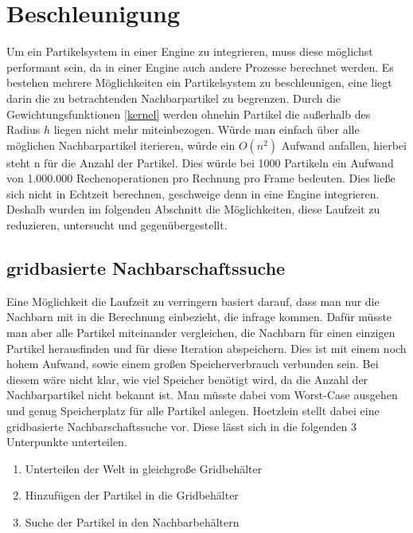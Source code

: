 \documentclass[intern,palatino]{cgBA}
\begin{document}
\section{Beschleunigung}\label{besch}

Um ein Partikelsystem in einer Engine zu integrieren, muss diese möglichst performant sein, da in einer Engine auch andere Prozesse berechnet werden. Es bestehen mehrere Möglichkeiten ein Partikelsystem zu beschleunigen, eine liegt darin die zu betrachtenden Nachbarpartikel zu begrenzen. Durch die Gewichtungsfunktionen \ref{kernel} werden ohnehin Partikel die außerhalb des Radius $h$ liegen nicht mehr miteinbezogen. Würde man einfach über alle möglichen Nachbarpartikel iterieren, würde ein $O(n^2)$ Aufwand anfallen, hierbei steht n für die Anzahl der Partikel. Dies würde bei 1000 Partikeln ein Aufwand von 1.000.000 Rechenoperationen pro Rechnung pro Frame bedeuten. Dies ließe sich nicht in Echtzeit berechnen, geschweige denn in eine Engine integrieren. Deshalb wurden im folgenden Abschnitt die Möglichkeiten, diese Laufzeit zu reduzieren, untersucht und gegenübergestellt.  


\subsection{gridbasierte Nachbarschaftssuche}\label{nachbar}

Eine Möglichkeit die Laufzeit zu verringern basiert darauf, dass man nur die Nachbarn mit in die Berechnung einbezieht, die infrage kommen. Dafür müsste man aber alle Partikel miteinander vergleichen, die Nachbarn für einen einzigen Partikel herausfinden und für diese Iteration abspeichern. Dies ist mit einem noch hohem Aufwand, sowie einem großen Speicherverbrauch verbunden sein. Bei diesem wäre nicht klar, wie viel Speicher benötigt wird, da die Anzahl der Nachbarpartikel nicht bekannt ist. Man müsste dabei vom Worst-Case ausgehen und genug Speicherplatz für alle Partikel anlegen.
\newline
Hoetzlein \cite{nvidia} stellt dabei eine gridbasierte Nachbarschaftssuche vor. Diese lässt sich in die folgenden 3 Unterpunkte unterteilen.

\begin{enumerate}
	\item Unterteilen der Welt in gleichgroße Gridbehälter
	\item Hinzufügen der Partikel in die Gridbehälter
	\item Suche der Partikel in den Nachbarbehältern 
\end{enumerate}
\end{document}
